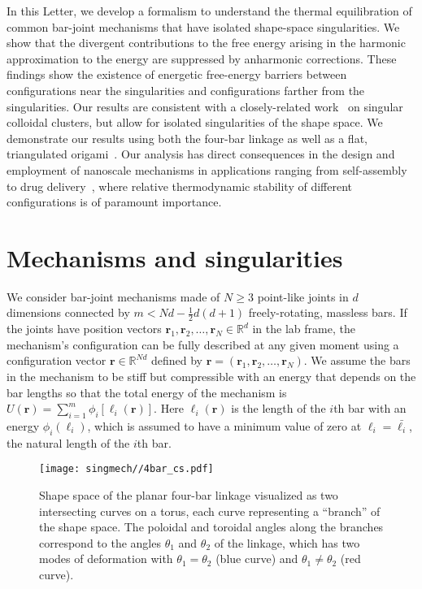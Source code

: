 In this Letter, we develop a formalism to understand the thermal equilibration of common bar-joint mechanisms that have isolated shape-space singularities.
We show that the divergent contributions to the free energy arising in the harmonic approximation to the energy are suppressed by anharmonic corrections.
These findings show the existence of energetic free-energy barriers between configurations near the singularities and configurations farther from the singularities.
Our results are consistent with a closely-related work~\cite{kallus2017,holmes-cerfon2017} on singular colloidal clusters, but allow for isolated singularities of the shape space.
We demonstrate our results using both the four-bar linkage as well as a flat, triangulated origami~\cite{chen2018}.
Our analysis has direct consequences in the design and employment of nanoscale mechanisms in applications ranging from self-assembly~\cite{liedl2010} to drug delivery~\cite{zhao2019}, where relative thermodynamic stability of different configurations is of paramount importance.

\section{Mechanisms and singularities}

We consider bar-joint mechanisms made of $N \geq 3$ point-like joints in $d$ dimensions connected by $m < Nd - \frac{1}{2}d(d+1)$ freely-rotating, massless bars.
If the joints have position vectors $\bm{r}_1, \bm{r}_2, \ldots, \bm{r}_{N} \in \mathbb{R}^d$ in the lab frame, the mechanism's configuration can be fully described at any given moment using a configuration vector $\bm{r}\in\mathbb{R}^{N d}$ defined by $\bm{r} = (\bm{r}_1, \bm{r}_2, \ldots, \bm{r}_{N})$.
We assume the bars in the mechanism to be stiff but compressible with an energy that depends on the bar lengths so that the total energy of the mechanism is $U(\bm{r}) = \sum_{i=1}^{m} \phi_{i}[\ell_{i}(\bm{r})]$.
Here $\ell_{i}(\bm{r})$ is the length of the $i$th bar with an energy $\phi_i(\ell_{i})$, which is assumed to have a minimum value of zero at $\ell_{i} = \bar{\ell_{i}}$, the natural length of the $i$th bar.
%
\begin{figure}
  \begin{center}
    \texttt{[image: singmech//4bar\_cs.pdf]}
  \end{center}
  \caption{Shape space of the planar four-bar linkage visualized as two intersecting curves on a torus, each curve representing a ``branch'' of the shape space.
    The poloidal and toroidal angles along the branches correspond to the angles $\theta_1$ and $\theta_2$ of the linkage, which has two modes of deformation with $\theta_{1} = \theta_{2}$ (blue curve) and $\theta_{1} \ne \theta_{2}$ (red curve).}
  \label{fig:4bar_cs}
\end{figure}

